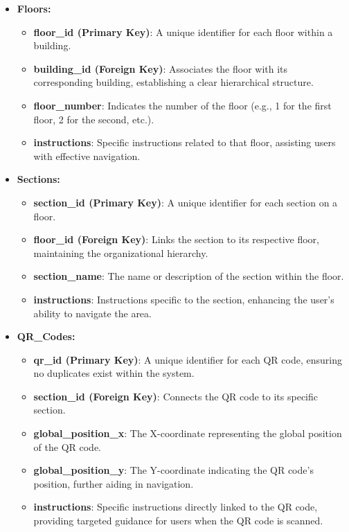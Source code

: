 \begin{itemize}
	\item \textbf{Floors:}
	\begin{itemize}
		\item \textbf{floor\_id (Primary Key)}: A unique identifier for each floor within a building.
		\item \textbf{building\_id (Foreign Key)}: Associates the floor with its corresponding building, establishing a clear hierarchical structure.
		\item \textbf{floor\_number}: Indicates the number of the floor (e.g., 1 for the first floor, 2 for the second, etc.).
		\item \textbf{instructions}: Specific instructions related to that floor, assisting users with effective navigation.
	\end{itemize}
	
	\item \textbf{Sections:}
	\begin{itemize}
		\item \textbf{section\_id (Primary Key)}: A unique identifier for each section on a floor.
		\item \textbf{floor\_id (Foreign Key)}: Links the section to its respective floor, maintaining the organizational hierarchy.
		\item \textbf{section\_name}: The name or description of the section within the floor.
		\item \textbf{instructions}: Instructions specific to the section, enhancing the user’s ability to navigate the area.
	\end{itemize}
	
	\item \textbf{QR\_Codes:}
	\begin{itemize}
		\item \textbf{qr\_id (Primary Key)}: A unique identifier for each QR code, ensuring no duplicates exist within the system.
		\item \textbf{section\_id (Foreign Key)}: Connects the QR code to its specific section.
		\item \textbf{global\_position\_x}: The X-coordinate representing the global position of the QR code.
		\item \textbf{global\_position\_y}: The Y-coordinate indicating the QR code's position, further aiding in navigation.
		\item \textbf{instructions}: Specific instructions directly linked to the QR code, providing targeted guidance for users when the QR code is scanned.
	\end{itemize}
\end{itemize}
